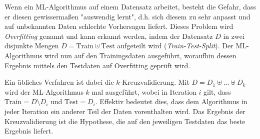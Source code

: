 Wenn ein ML-Algorithmus auf einem Datensatz arbeitet, besteht die Gefahr, dass er diesen gewissermaßen "auswendig lernt", d.h. sich diesem zu sehr anpasst und auf unbekannten Daten schlechte Vorhersagen liefert. Dieses Problem wird \textit{Overfitting} genannt und kann erkannt werden, indem der Datensatz $D$ in zwei disjunkte Mengen $D = \text{Train} \uplus \text{Test}$ aufgeteilt wird (\textit{Train-Test-Split}). Der ML-Algorithmus wird nun auf den Trainingsdaten ausgeführt, woraufhin dessen Ergebnis mittels den Testdaten auf Overfitting geprüft wird.

Ein übliches Verfahren ist dabei die $k$-Kreuzvalidierung. Mit $D = D_1 \uplus ... \uplus D_k$ wird der ML-Algorithmus $k$ mal ausgeführt, wobei in Iteration $i$ gilt, dass $\text{Train} = D \setminus D_i$ und $\text{Test} = D_i$. Effektiv bedeutet dies, dass dem Algorithmus in jeder Iteration ein anderer Teil der Daten vorenthalten wird. Das Ergebnis der Kreuzvalidierung ist die Hypothese, die auf den jeweiligen Testdaten das beste Ergebnis liefert.

